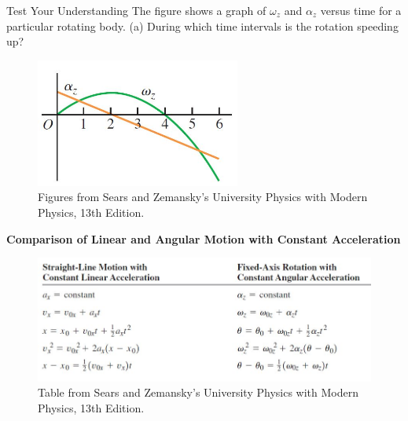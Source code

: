 \documentclass[]{beamer}
\begin{document}

\begin{frame}
     
    Test Your Understanding 
    \vspace{3mm}
    The figure shows a graph of $\omega_z$ and $\alpha_z$ versus time
    for a particular rotating body. (a) During which time
    intervals is the rotation speeding up?

    \begin{figure}[h!]  
       \includegraphics[width=0.6\textwidth]{images/15.jpg}
       \caption{ {\tiny Figures from Sears and Zemansky's University Physics 
       with Modern Physics, 13th Edition.} }
     \end{figure}
  
  
       \end{frame}
  

\begin{frame}
  \textbf{Comparison of Linear and Angular Motion with
  Constant Acceleration}   
  \vspace{5mm}

  \begin{figure}[h!]  
    \includegraphics[width=1.0\textwidth]{images/16.jpg}
    \caption{ {\tiny Table from Sears and Zemansky's University Physics 
    with Modern Physics, 13th Edition.} }
  \end{figure}
  
       \end{frame}
  
\end{document}
